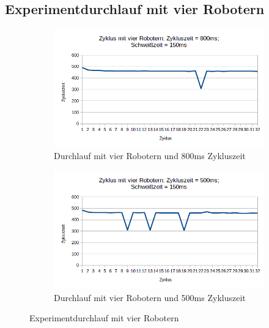 \clearpage

\subsection{Experimentdurchlauf mit vier Robotern}
\label{lamport_problem}

\begin{figure}[h]
 \begin{subfigure}{.5\textwidth}
  \centering
  \includegraphics[width=\linewidth]{../evaluation_results/4_800.png}
  \caption{Durchlauf mit vier Robotern und \newline 800ms Zykluszeit}
  \label{fig:eval_4_800}
 \end{subfigure}
 \begin{subfigure}{.5\textwidth}
  \centering
  \includegraphics[width=\linewidth]{../evaluation_results/4_500.png}
  \caption{Durchlauf mit vier Robotern und \newline 500ms Zykluszeit}
  \label{fig:eval_4_500}
 \end{subfigure}
 \caption{Experimentdurchlauf mit vier Robotern}
 \label{fig:eval_4}
\end{figure}

